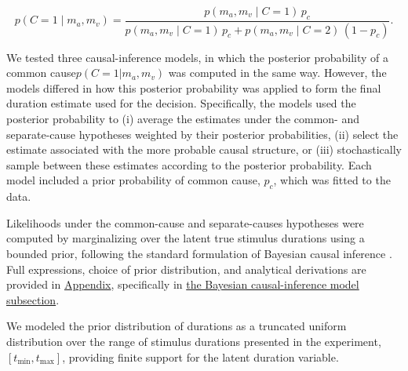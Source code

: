 \documentclass[9pt,lineno,doublespacing]{elife}
\begin{document}
\begin{equation}
p(C=1 \mid m_a, m_v)
=
\frac{
p(m_a, m_v \mid C=1)\, p_c
}{
p(m_a, m_v \mid C=1)\, p_c
+
p(m_a, m_v \mid C=2)\, (1 - p_c)
}.
\label{eq:posterior_common_cause}
\end{equation}


We tested three causal-inference models, in which the posterior probability of a common cause$p(C=1|m_a,m_v)$ was computed in the same way. However, the models differed in how this posterior probability was applied to form the final duration estimate used for the decision. Specifically, the models used the posterior probability to (i) average the estimates under the common- and separate-cause hypotheses weighted by their posterior probabilities, (ii) select the estimate associated with the more probable causal structure, or (iii) stochastically sample between these estimates according to the posterior probability. Each model included a prior probability of common cause, $p_c$, which was fitted to the data.

Likelihoods under the common-cause and separate-causes hypotheses were computed by marginalizing over the latent true stimulus durations using a bounded prior, following the standard formulation of Bayesian causal inference \citep{kording2007causal}. Full expressions, choice of prior distribution, and analytical derivations are provided in \hyperref[app:appendix]{Appendix}, specifically in \hyperref[causal_inf_equations]{the Bayesian causal-inference model subsection}.

We modeled the prior distribution of durations as a truncated uniform distribution over the range of stimulus durations presented in the experiment, $[t_{\min}, t_{\max}]$, providing finite support for the latent duration variable. 
\end{document}
